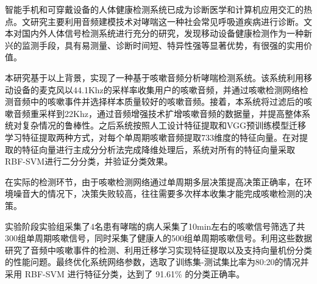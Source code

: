 智能手机和可穿戴设备的人体健康检测系统已成为诊断医学和计算机应用交汇的热点。文研究主要利用音频建模技术对哮喘这一种社会常见呼吸道疾病进行诊断。文本对国内外人体信号检测系统进行充分的研究，发现移动设备健康检测作为一种新兴的监测手段，具有易测量、诊断时间短、特异性强等显著优势，有很强的实用价值。

本研究基于以上背景，实现了一种基于咳嗽音频分析哮喘检测系统。该系统利用移动设备的麦克风以44.1Khz的采样率收集用户的咳嗽音频，并通过咳嗽检测网络检测音频中的咳嗽事件并选择样本质量较好的咳嗽音频。接着，本系统将过滤后的咳嗽音频重采样到22Khz，通过音频增强技术扩增咳嗽音频的数据量，并提高整体系统对复杂情况的鲁棒性。之后系统按照人工设计特征提取和VGG预训练模型迁移学习特征提取两种方式，对每个单周期咳嗽音频提取733维度的特征向量。在对提取的特征向量进行主成分分析法完成降维处理后，系统对所有的特征向量采取RBF-SVM进行二分分类，并验证分类效果。

在实际的检测环节，由于咳嗽检测网络通过单周期多层决策提高决策正确率，在环境噪音大的情况下，决策失败较高，往往需要多次样本收集才能完成咳嗽检测的决策。

实验阶段实验组采集了4名患有哮喘的病人采集了10min左右的咳嗽信号筛选了共300组单周期咳嗽信号，同时采集了健康人的500组单周期咳嗽信号。利用这些数据研究了音频中咳嗽事件的检测、利用迁移学习实现特征提取以及支持向量机份分类的性能问题。最终优化系统网络参数，选取了训练集-测试集比率为80:20的情况并采用 RBF-SVM 进行特征分类，达到了 91.61\% 的分类正确率。

